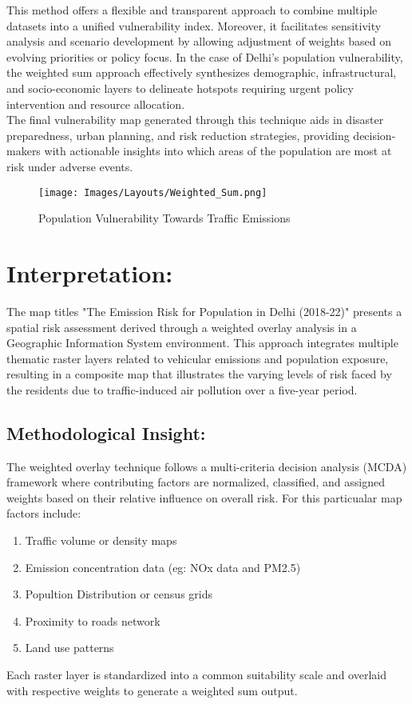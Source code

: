 \documentclass[12pt]{report}
\begin{document}
This method offers a flexible and transparent approach to combine multiple datasets into a unified vulnerability index. Moreover, it facilitates sensitivity analysis and scenario development by allowing adjustment of weights based on evolving priorities or policy focus. In the case of Delhi’s population vulnerability, the weighted sum approach effectively synthesizes demographic, infrastructural, and socio-economic layers to delineate hotspots requiring urgent policy intervention and resource allocation.\\
The final vulnerability map generated through this technique aids in disaster preparedness, urban planning, and risk reduction strategies, providing decision-makers with actionable insights into which areas of the population are most at risk under adverse events.

\begin{figure}[H]
    \centering
    \texttt{[image: Images/Layouts/Weighted\_Sum.png]}
    \caption{Population Vulnerability Towards Traffic Emissions}
    \label{fig:enter-label}
\end{figure}

\section{Interpretation:}
The map titles "The Emission Risk for Population in Delhi (2018-22)" presents a spatial risk assessment derived through a weighted overlay analysis in a Geographic Information System environment. This approach integrates multiple thematic raster layers related to vehicular emissions and population exposure, resulting in a composite map that illustrates the varying levels of risk faced by the residents due to traffic-induced air pollution over a five-year period.
\subsection{Methodological Insight:}
The weighted overlay technique follows a multi-criteria decision analysis (MCDA) framework where contributing factors are normalized, classified, and assigned weights based on their relative influence on overall risk. For this particualar map factors include:
\begin{enumerate}
    \item Traffic volume or density maps
    \item Emission concentration data (eg: NOx data and PM2.5)
    \item Popultion Distribution or census grids
    \item Proximity to roads network
    \item Land use patterns
\end{enumerate}
Each raster layer is standardized into a common suitability scale and overlaid with respective weights to generate a weighted sum output.
\end{document}
